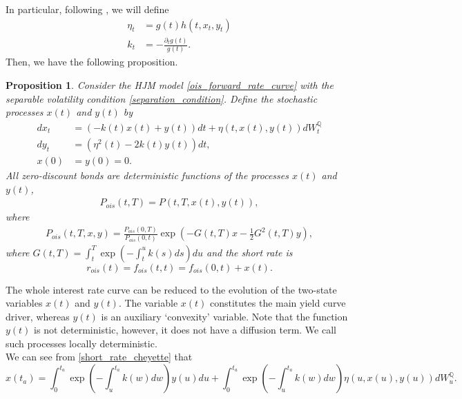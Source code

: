 \documentclass[a4paper,10pt]{article}
\newtheorem{proposition}[theorem]{Proposition}
\newcommand{\1}{\mathbf{1}}
\begin{document}
In particular, following \cite{AndreasenPiterbarg}, we will define
\begin{align*}
\eta_t &= g(t)h(t,x_t,y_t)  \nonumber \\
k_t &= - \frac{\partial_t g(t)}{g(t)}.
\end{align*}
Then, we have the following proposition.
\begin{proposition}
Consider the HJM model \eqref{ois_forward_rate_curve} with the separable volatility condition \eqref{separation_condition}. Define the stochastic processes $x(t)$ and $y(t)$ by
\begin{align}\label{short_rate_cheyette}
dx_t &= \left(-k(t) x(t) + y(t)\right)dt + \eta\left(t,x(t),y(t)\right) dW_t^{\mathbb{Q}} \nonumber \\
dy_t &= \left(\eta^{2}(t) - 2 k(t) y(t)\right) dt ,\nonumber \\
x(0) &=y(0)=0.
\end{align}
All zero-discount bonds are deterministic functions of the processes $x(t)$ and $y(t)$,
\begin{eqnarray*}
P_{ois}(t,T)=P(t, T, x(t), y(t)), 
\end{eqnarray*}
where 
\begin{eqnarray}\label{bond_ois}
P_{ois}(t,T,x,y) = \frac{P_{ois}(0,T)}{P_{ois}(0,t)} \exp\left(-G(t,T)x - \frac{1}{2} G^{2}(t,T)y \right),
\end{eqnarray}
where $G(t,T) = \int_{t}^{T} \exp\left(-\int_{t}^{u} k(s) ds \right) du$ and the short rate is
\begin{equation}
r_{ois}(t)=f_{ois}(t,t)= f_{ois}(0,t) + x(t).
\end{equation} 
\end{proposition}

The whole interest rate curve can be reduced to the evolution of the two-state variables $x(t)$ and $y(t)$. The variable $x(t)$ constitutes the main yield curve driver, whereas $y(t)$ is an auxiliary `convexity' variable. Note that the function $y(t)$ is not deterministic, however, it does not have a diffusion term. We call such processes locally deterministic. \\

We can see from \eqref{short_rate_cheyette} that
\begin{equation*}
x(t_a) = \int_{0}^{t_a} \exp\left(-\int_{u}^{t_a}k(w) dw\right) y(u) du + \int_{0}^{t_a}  \exp\left(-\int_{u}^{t_a}k(w) dw \right) \eta(u,x(u),y(u)) dW_u^{\mathbb{Q}}. 
\end{equation*}
\end{document}
